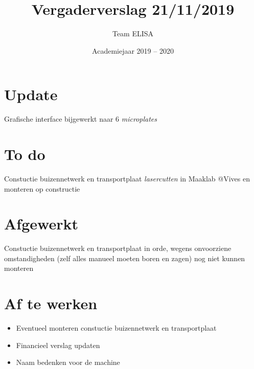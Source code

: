 \documentclass[a4paper,kulak]{kulakarticle} %
\date{Academiejaar 2019 -- 2020}
\title{Vergaderverslag 21/11/2019}
\author{Team ELISA}
\begin{document}
	
	\maketitle
	\section*{Update}
	Grafische interface bijgewerkt naar 6 \textit{microplates}
	\section*{To do}
	Constuctie buizennetwerk en transportplaat \textit{lasercutten} in Maaklab @Vives en monteren op constructie
	
	\section*{Afgewerkt}
	
	Constuctie buizennetwerk en transportplaat in orde, wegens onvoorziene omstandigheden (zelf alles manueel moeten boren en zagen) nog niet kunnen monteren
	
	
	\section*{Af te werken}
	\begin{itemize}
		\item Eventueel monteren constuctie buizennetwerk en transportplaat
		\item Financieel verslag updaten
		\item Naam bedenken voor de machine
	\end{itemize}
	
	
\end{document}
